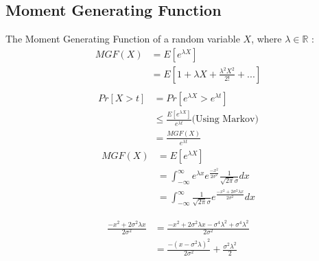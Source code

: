 \documentclass[11pt]{article}
\begin{document}
\subsection{Moment Generating Function}
The Moment Generating Function of a random variable $X$, where $\lambda \in \mathbb{R}$ :
\begin{equation}
\begin{split}
MGF(X) &= E[e^{\lambda X}]\\
&= E[1 + \lambda X + \frac{\lambda^2X^2}{2!} + ...]\\
\end{split}
\end{equation}
\begin{equation}
\begin{split}
Pr[X>t] &= Pr[e^{\lambda X}>e^{\lambda t}]\\
&\leq \frac{E[e^{\lambda X}]}{e^{\lambda t}} \text{(Using Markov)}\\
&= \frac{MGF(X)}{e^{\lambda t}}
\end{split}
\end{equation}
\begin{equation}
\begin{split}
MGF(X) &= E[e^{\lambda X}] \\
&= \int_{-\infty}^{\infty} e^{\lambda x}e^{\frac{-x^2}{2\sigma^2}}\frac{1}{\sqrt{2\pi}\sigma} dx\\
&= \int_{-\infty}^{\infty} \frac{1}{\sqrt{2\pi}\sigma} e^{\frac{-x^2 + 2\sigma^2\lambda x}{2\sigma^2}} dx
\end{split}
\end{equation}

\begin{equation}
\begin{split}
\frac{-x^2 + 2\sigma^2\lambda x}{2\sigma^2} &= \frac{-x^2 + 2\sigma^2\lambda x -\sigma^4\lambda^2 + \sigma^4\lambda^2}{2\sigma^2} \\
&= \frac{-(x-\sigma^2\lambda)^2}{2\sigma^2} + \frac{\sigma^2\lambda^2}{2}
\end{split}
\end{equation}
\end{document}
